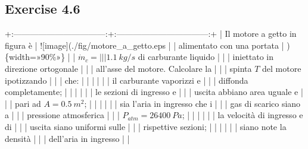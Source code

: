 \documentclass[letterpaper,10pt,italian]{jupyterBook}
\begin{document}
\subsection{Exercise 4.6}
\label{\detokenize{polimi/fluidmechanics-ita/template/capitoli/04_bilanci/0403in:exercise-4-6}}\label{\detokenize{polimi/fluidmechanics-ita/template/capitoli/04_bilanci/0403in:fluid-mechanics-balances-ex-06}}\label{\detokenize{polimi/fluidmechanics-ita/template/capitoli/04_bilanci/0403in::doc}}
\sphinxAtStartPar
+:———————————:+:———————————:+
| Il motore a getto in figura è     | !{[}image{]}(./fig/motore\_a\_getto.eps |
| alimentato con una portata        | )\{width=»90\%»\}                    |
| \(\dot{m}_c =                      |                                   |
| 1.1\ kg/s\) di carburante liquido  |                                   |
| iniettato in direzione ortogonale |                                   |
| all’asse del motore. Calcolare la |                                   |
| spinta \(T\) del motore ipotizzando |                                   |
| che:                              |                                   |
|                                   |                                   |
| \sphinxhyphen{}   il carburante vaporizzi e     |                                   |
|     diffonda completamente;       |                                   |
|                                   |                                   |
| \sphinxhyphen{}   le sezioni di ingresso e      |                                   |
|     uscita abbiano area uguale e  |                                   |
|     pari ad \(A = 0.5\ m^2\);       |                                   |
|                                   |                                   |
| \sphinxhyphen{}   sia l’aria in ingresso che i  |                                   |
|     gas di scarico siano a        |                                   |
|     pressione atmosferica         |                                   |
|     \(P_{atm}=26400\ Pa\);          |                                   |
|                                   |                                   |
| \sphinxhyphen{}   la velocità di ingresso e di  |                                   |
|     uscita siano uniformi sulle   |                                   |
|     rispettive sezioni;           |                                   |
|                                   |                                   |
| \sphinxhyphen{}   siano note la densità         |                                   |
|     dell’aria in ingresso         |                                   |
\end{document}
